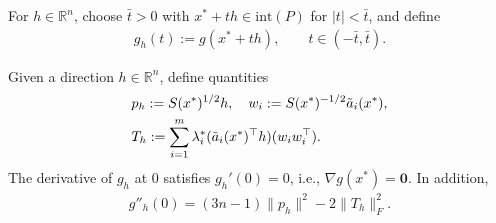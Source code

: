 \documentclass[smallextended]{svjour3}
\newcommand{\R}{\mathbb{R}}
\begin{document}
For $h\in\R^n$, choose $\bar t>0$ with
$x^*+th\in\mathrm{int}(P)$ for $|t|<\bar t$, and define
\begin{align}\label{eq: g_directional_derivative}
        g_h(t) := g(x^* + th), \qquad t\in(-\bar t,\bar t).
\end{align}
\begin{lemma}\label{lemma: derivative_of_g}
    Given a direction $h\in \R^n$, define quantities
    \begin{align}\label{eq: g_derivative_components}
        & p_h := S(x^*)^{1/2} h, \quad
        w_i := S(x^*)^{-1/2} \tilde{a}_i(x^*), \notag \\
        & T_h := \sum_{i=1}^m \lambda^*_i (\tilde{a}_i(x^*)^\top h)(w_iw_i^\top).
    \end{align}
    The derivative of $g_h$ at $0$ satisfies $g_h'(0) = 0$, i.e., $\nabla g(x^*) = \mathbf{0}$. In addition, 
    \begin{align*}
            g''_h(0) = (3n-1)\|p_h\|^2 - 2\|T_h\|_F^2.
    \end{align*}
\end{lemma}
\end{document}
